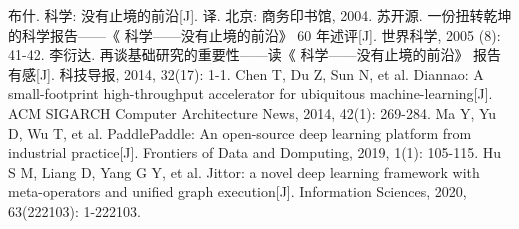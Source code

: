 \nocite{*}

\begin{thebibliography}{10}
    布什. 科学: 没有止境的前沿[J]. 译. 北京: 商务印书馆, 2004.
    苏开源. 一份扭转乾坤的科学报告——《 科学——没有止境的前沿》 60 年述评[J]. 世界科学, 2005 (8): 41-42.
    李衍达. 再谈基础研究的重要性——读《 科学——没有止境的前沿》 报告有感[J]. 科技导报, 2014, 32(17): 1-1.
    Chen T, Du Z, Sun N, et al. Diannao: A small-footprint high-throughput accelerator for ubiquitous machine-learning[J]. ACM SIGARCH Computer Architecture News, 2014, 42(1): 269-284.
    Ma Y, Yu D, Wu T, et al. PaddlePaddle: An open-source deep learning platform from industrial practice[J]. Frontiers of Data and Domputing, 2019, 1(1): 105-115.
    Hu S M, Liang D, Yang G Y, et al. Jittor: a novel deep learning framework with meta-operators and unified graph execution[J]. Information Sciences, 2020, 63(222103): 1-222103.
\end{thebibliography}
